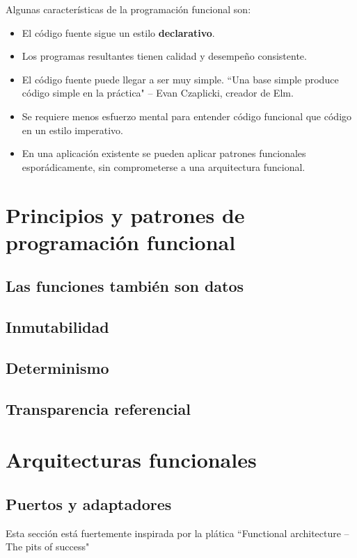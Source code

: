 \documentclass{article}
\begin{document}
Algunas características de la programación funcional son:
\begin{itemize}
  \item El código fuente sigue un estilo \textbf{declarativo}.
  \item Los programas resultantes tienen calidad y desempeño consistente.
  \item El código fuente puede llegar a ser muy simple. ``Una base simple produce código simple en la práctica" \medspace – Evan Czaplicki, creador de Elm\cite{mainstream-elm}.
  \item Se requiere menos esfuerzo mental para entender código funcional que código en un estilo imperativo\cite{skeptics-functional-style}.
  \item En una aplicación existente se pueden aplicar patrones funcionales esporádicamente, sin comprometerse a una arquitectura funcional\cite{skeptics-functional-style}.
\end{itemize}


\section{Principios y patrones de programación funcional}


\subsection{Las funciones también son datos}


\subsection{Inmutabilidad}


\subsection{Determinismo}


\subsection{Transparencia referencial}


\section{Arquitecturas funcionales}


\subsection{Puertos y adaptadores}
Esta sección está fuertemente inspirada por la plática ``Functional architecture – The pits of success"\cite{functional-architecture}
\end{document}
